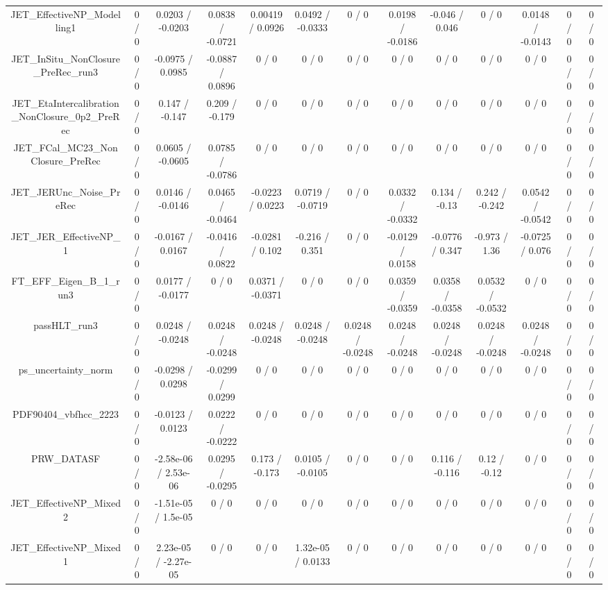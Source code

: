 \documentclass[10pt]{article}
\begin{document}
\begin{table}[htbp]
\begin{center}
\begin{tabular}{|c|c|c|c|c|c|c|c|c|c|c|c|c|}
  JET_EffectiveNP_Modelling1 & 0 / 0 & 0.0203 / -0.0203 & 0.0838 / -0.0721 & 0.00419 / 0.0926 & 0.0492 / -0.0333 & 0 / 0 & 0.0198 / -0.0186 & -0.046 / 0.046 & 0 / 0 & 0.0148 / -0.0143 & 0 / 0 & 0 / 0 \\ 
  JET_InSitu_NonClosure_PreRec_run3 & 0 / 0 & -0.0975 / 0.0985 & -0.0887 / 0.0896 & 0 / 0 & 0 / 0 & 0 / 0 & 0 / 0 & 0 / 0 & 0 / 0 & 0 / 0 & 0 / 0 & 0 / 0 \\ 
  JET_EtaIntercalibration_NonClosure_0p2_PreRec & 0 / 0 & 0.147 / -0.147 & 0.209 / -0.179 & 0 / 0 & 0 / 0 & 0 / 0 & 0 / 0 & 0 / 0 & 0 / 0 & 0 / 0 & 0 / 0 & 0 / 0 \\ 
  JET_FCal_MC23_NonClosure_PreRec & 0 / 0 & 0.0605 / -0.0605 & 0.0785 / -0.0786 & 0 / 0 & 0 / 0 & 0 / 0 & 0 / 0 & 0 / 0 & 0 / 0 & 0 / 0 & 0 / 0 & 0 / 0 \\ 
  JET_JERUnc_Noise_PreRec & 0 / 0 & 0.0146 / -0.0146 & 0.0465 / -0.0464 & -0.0223 / 0.0223 & 0.0719 / -0.0719 & 0 / 0 & 0.0332 / -0.0332 & 0.134 / -0.13 & 0.242 / -0.242 & 0.0542 / -0.0542 & 0 / 0 & 0 / 0 \\ 
  JET_JER_EffectiveNP_1 & 0 / 0 & -0.0167 / 0.0167 & -0.0416 / 0.0822 & -0.0281 / 0.102 & -0.216 / 0.351 & 0 / 0 & -0.0129 / 0.0158 & -0.0776 / 0.347 & -0.973 / 1.36 & -0.0725 / 0.076 & 0 / 0 & 0 / 0 \\ 
  FT_EFF_Eigen_B_1_run3 & 0 / 0 & 0.0177 / -0.0177 & 0 / 0 & 0.0371 / -0.0371 & 0 / 0 & 0 / 0 & 0.0359 / -0.0359 & 0.0358 / -0.0358 & 0.0532 / -0.0532 & 0 / 0 & 0 / 0 & 0 / 0 \\ 
  passHLT_run3 & 0 / 0 & 0.0248 / -0.0248 & 0.0248 / -0.0248 & 0.0248 / -0.0248 & 0.0248 / -0.0248 & 0.0248 / -0.0248 & 0.0248 / -0.0248 & 0.0248 / -0.0248 & 0.0248 / -0.0248 & 0.0248 / -0.0248 & 0 / 0 & 0 / 0 \\ 
  ps_uncertainty_norm & 0 / 0 & -0.0298 / 0.0298 & -0.0299 / 0.0299 & 0 / 0 & 0 / 0 & 0 / 0 & 0 / 0 & 0 / 0 & 0 / 0 & 0 / 0 & 0 / 0 & 0 / 0 \\ 
  PDF90404_vbfhcc_2223 & 0 / 0 & -0.0123 / 0.0123 & 0.0222 / -0.0222 & 0 / 0 & 0 / 0 & 0 / 0 & 0 / 0 & 0 / 0 & 0 / 0 & 0 / 0 & 0 / 0 & 0 / 0 \\ 
  PRW_DATASF & 0 / 0 & -2.58e-06 / 2.53e-06 & 0.0295 / -0.0295 & 0.173 / -0.173 & 0.0105 / -0.0105 & 0 / 0 & 0 / 0 & 0.116 / -0.116 & 0.12 / -0.12 & 0 / 0 & 0 / 0 & 0 / 0 \\ 
  JET_EffectiveNP_Mixed2 & 0 / 0 & -1.51e-05 / 1.5e-05 & 0 / 0 & 0 / 0 & 0 / 0 & 0 / 0 & 0 / 0 & 0 / 0 & 0 / 0 & 0 / 0 & 0 / 0 & 0 / 0 \\ 
  JET_EffectiveNP_Mixed1 & 0 / 0 & 2.23e-05 / -2.27e-05 & 0 / 0 & 0 / 0 & 1.32e-05 / 0.0133 & 0 / 0 & 0 / 0 & 0 / 0 & 0 / 0 & 0 / 0 & 0 / 0 & 0 / 0 \\ 

\end{tabular}
\end{center}
\end{table}
\end{document}
